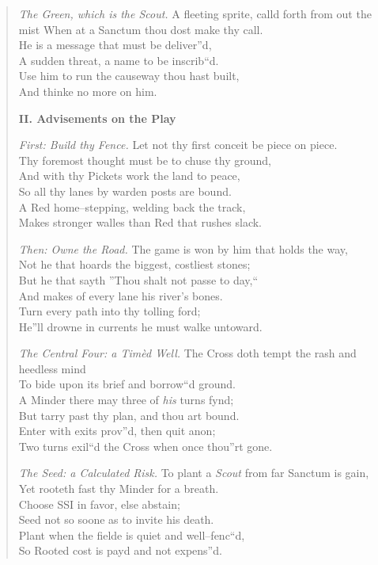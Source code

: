 \documentclass[11pt]{article}
\begin{document}
\begin{quote}
\textit{The Green, which is the Scout.}
A fleeting sprite, calld forth from out the mist
When at a Sanctum thou dost make thy call.\\
He is a message that must be deliver''d,\\
A sudden threat, a name to be inscrib``d.\\
Use him to run the causeway thou hast built,\\
And thinke no more on him.

\medskip
\textbf{II. Advisements on the Play}

\textit{First: Build thy Fence.}
Let not thy first conceit be piece on piece.\\
Thy foremost thought must be to chuse thy ground,\\
And with thy Pickets work the land to peace,\\
So all thy lanes by warden posts are bound.\\
A Red home--stepping, welding back the track,\\
Makes stronger walles than Red that rushes slack.

\textit{Then: Owne the Road.}
The game is won by him that holds the way,\\
Not he that hoards the biggest, costliest stones;\\
But he that sayth ''Thou shalt not passe to day,``\\
And makes of every lane his river's bones.\\
Turn every path into thy tolling ford;\\
He''ll drowne in currents he must walke untoward.

\textit{The Central Four: a Tim\`{e}d Well.}
The Cross doth tempt the rash and heedless mind\\
To bide upon its brief and borrow``d ground.\\
A Minder there may three of \emph{his} turns fynd;\\
But tarry past thy plan, and thou art bound.\\
Enter with exits prov''d, then quit anon;\\
Two turns exil``d the Cross when once thou''rt gone.

\textit{The Seed: a Calculated Risk.}
To plant a \emph{Scout} from far Sanctum is gain,\\
Yet rooteth fast thy Minder for a breath.\\
Choose SSI in favor, else abstain;\\
Seed not so soone as to invite his death.\\
Plant when the fielde is quiet and well--fenc``d,\\
So Rooted cost is payd and not expens''d.


\end{quote}
\end{document}
